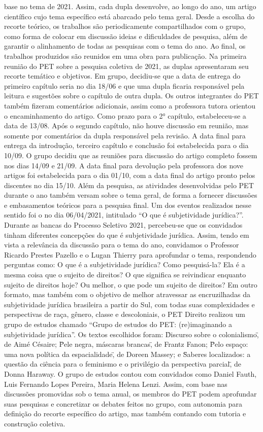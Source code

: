 base no tema de 2021.
Assim, cada dupla desenvolve, ao longo do ano, um artigo científico cujo tema específico
está abarcado pelo tema geral. Desde a escolha do recorte teórico, os trabalhos são
periodicamente compartilhados com o grupo, como forma de colocar em discussão ideias e
dificuldades de pesquisa, além de garantir o alinhamento de todas as pesquisas com o tema do
ano. Ao final, os trabalhos produzidos são reunidos em uma obra para publicação.
Na primeira reunião do PET sobre a pesquisa coletiva de 2021, as duplas apresentaram
seu recorte temático e objetivos. Em grupo, decidiu-se que a data de entrega do primeiro capítulo
seria no dia 18/06 e que uma dupla ficaria responsável pela leitura e sugestões sobre o capítulo
de outra dupla. Os outros integrantes do PET também fizeram comentários adicionais, assim
como a professora tutora orientou o encaminhamento do artigo.
Como prazo para o 2° capítulo, estabeleceu-se a data de 13/08. Após o segundo capítulo,
não houve discussão em reunião, mas somente por comentários da dupla responsável pela
revisão. A data final para entrega da introdução, terceiro capítulo e conclusão foi estabelecida
para o dia 10/09. O grupo decidiu que as reuniões para discussão do artigo completo fossem nos
dias 14/09 e 21/09. A data final para devolução pela professora dos nove artigos foi estabelecida
para o dia 01/10, com a data final do artigo pronto pelos discentes no dia 15/10.
Além da pesquisa, as atividades desenvolvidas pelo PET durante o ano também versam
sobre o tema geral, de forma a fornecer discussões e embasamentos teóricos para a pesquisa
final. Um dos eventos realizados nesse sentido foi o no dia 06/04/2021, intitulado “O que é
subjetividade jurídica?”. Durante as bancas do Processo Seletivo 2021, percebeu-se que os
convidados tinham diferentes concepções do que é subjetividade jurídica. Assim, tendo em vista
a relevância da discussão para o tema do ano, convidamos o Professor Ricardo Prestes Pazello e
o Lugan Thierry para aprofundar o tema, respondendo perguntas como: O que é a subjetividade
jurídica? Como pesquisá-la? Ela é a mesma coisa que o sujeito de direitos? O que significa se
reivindicar enquanto sujeito de direitos hoje? Ou melhor, o que pode um sujeito de direitos?
Em outro formato, mas também com o objetivo de melhor atravessar as encruzilhadas da
subjetividade jurídica brasileira a partir do Sul, com todas suas complexidades e perspectivas de
raça, gênero, classe e descoloniais, o PET Direito realizou um grupo de estudos chamado “Grupo
de estudos do PET: (re)imaginando a subjetividade jurídica”. Os textos escolhidos foram:
\"Discurso sobre o colonialismo\", de Aimé Césaire; \"Pele negra, máscaras brancas\", de Frantz
Fanon; \"Pelo espaço: uma nova política da espacialidade\", de Doreen Massey; e \"Saberes
localizados: a questão da ciência para o feminismo e o privilégio da perspectiva parcial\", de
Donna Haraway. O grupo de estudos contou com convidados como Daniel Fauth, Luis Fernando
Lopes Pereira, Maria Helena Lenzi. Assim, com base nas discussões promovidas sob o tema
anual, os membros do PET podem aprofundar suas pesquisas e concretizar os debates feitos no
grupo, com autonomia para definição do recorte específico do artigo, mas também contando com
tutoria e construção coletiva.

